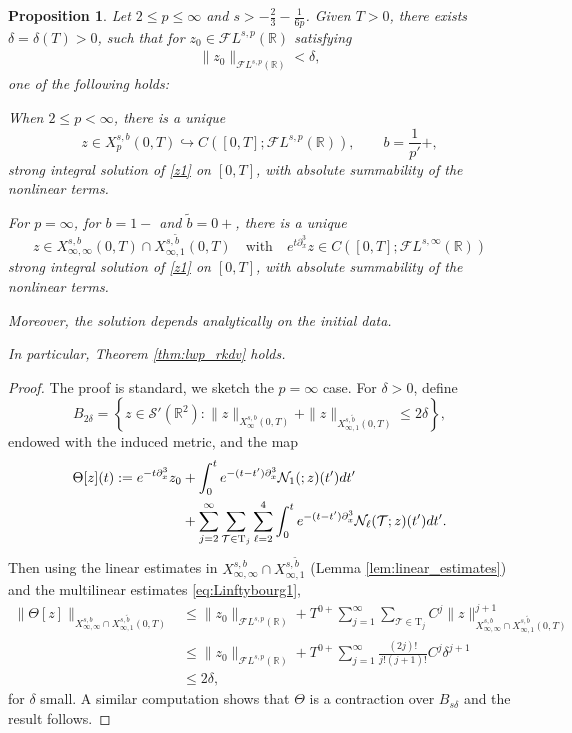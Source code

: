 \documentclass[%
11pt,  reqno]{amsart}
\makeatletter
\newcommand{\5}{\textup{V}}
\newcommand{\noi}{\noindent}
\newcommand{\FL}{\mathcal{F} L}
\newcommand{\dl}{\delta}
\newcommand{\wt}{\widetilde}
\newtheorem{proposition}[theorem]{Proposition}
\theoremstyle{remark}
\newcommand{\R}{\mathbb{R}}
\newcommand{\TT}{\mathcal{T}}
\newcommand{\Tr}{\mathrm{T}}
\renewcommand{\l}{\ell}
\def\<#1>{\csname MH@symb@#1\endcsname}
\numberwithin{equation}{section}
\numberwithin{theorem}{section}
\newcommand{\Ncal}{\mathcal{N}}
\newcommand{\andreia}[1]{\marginpar{\color{purple} $\Leftarrow\Leftarrow\Leftarrow$}{\smallskip \noi\color{purple}ANDREIA: #1}\smallskip}
\makeatother
\begin{document}
\begin{proposition}\label{thm:lwp_lp}
Let $2 \le p \le \infty$ and $s> - \frac23 - \frac{1}{6p}$.
    Given $T>0$, there exists $\dl = \dl(T)>0$, such that for $z_0 \in \FL^{s, p}(\R)$ satisfying
\begin{align}
    \|z_0\|_{\FL^{s,p}(\R)} < \dl, 
\end{align}
one of the following holds:



\noi{\rm(i)}
When $ 2 \le p <\infty$, 
there is a unique
	$$z\in X^{s,b}_{p}(0,T)\hookrightarrow C([0,T]; \mathcal{F}L^{s,p}(\R)),\qquad b=\frac{1}{p'}+,$$ strong integral solution of \eqref{z1} on $[0,T]$, with absolute summability of the nonlinear terms.

\smallskip
\noi{\rm(ii)}
For $p=\infty$, for $b=1-$ and $\tilde{b}=0+$, there is  a unique 
	$$z\in X^{s,b}_{\infty,\infty}(0,T)\cap X^{s,\tilde{b}}_{\infty,1}(0,T)
    \quad 
    \text{with}
    \quad 
    e^{t\partial_x^3}z \in C([0,T]; \mathcal{F}L^{s,\infty}(\R))
    $$ 
  strong integral solution of \eqref{z1} on $[0,T]$, with absolute summability of the nonlinear terms.

\smallskip 
\noi
    Moreover, the solution depends analytically on the initial data.

\smallskip
In particular, Theorem \ref{thm:lwp_rkdv} holds.
\end{proposition}

\begin{proof}
    The proof is standard, we sketch the $p=\infty$ case. For $\delta>0$, define
	$$
	B_{2\delta}=\left\{ z\in \mathcal{S}'(\R^2) : \|z\|_{X^{s,b}_{\infty}(0,T)} + \|z\|_{X^{s,\tilde{b}}_{\infty,1}(0,T)}\le 2\delta \right\},
	$$
    endowed with the induced metric,
    and the map
    \begin{align}
		\Theta[z](t) := e^{-t\partial_x^3}z_0 
        &+ \int_0^t e^{-(t-t')\partial_x^3} \Ncal_1(\<1>; z)(t')dt' 
        \\&+ 
        \sum_{j=2}^\infty \sum_{\TT \in \Tr_j} \sum_{\l=2}^4 
        \int_0^t e^{-(t-t')\partial_x^3} \Ncal_\l (\TT;  z)(t')dt'.
        \label{eq:Theta}
\end{align}
Then using the linear estimates in $X^{s,b}_{\infty,\infty}\cap X^{s,\wt{b}}_{\infty,1}$ (Lemma \ref{lem:linear_estimates}) and the multilinear estimates \eqref{eq:Linftybourg1}, 
\begin{align*}
		\|\Theta[z]\|_{X^{s,b}_{\infty,\infty}\cap X^{s,\wt{b}}_{\infty,1}(0,T)} &\le \|z_0\|_{\mathcal{F}L^{s,p}(\R)} + T^{0+} \sum_{j=1}^\infty \sum_{\TT \in \Tr_{j}}  C^j\|z\|_{X^{s,b}_{\infty,\infty}\cap X^{s,\wt{b}}_{\infty,1}(0,T)}^{j+1} \\&\le \|z_0\|_{\mathcal{F}L^{s,p}(\R)} + T^{0+} \sum_{j=1}^\infty \frac{(2j)!}{j!(j+1)!} C^j \delta^{j+1}\\&\le 2\delta,
\end{align*}
for $\delta$ small. A similar computation shows that $\Theta$ is a contraction over $B_{s\delta}$ and the result follows.
\end{proof}
\end{document}
